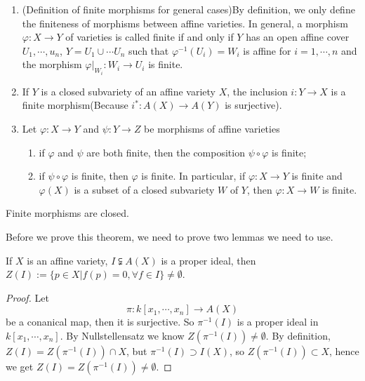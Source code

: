 \begin{remark}{}
  \noindent
	\begin{enumerate}
		\item (Definition of finite morphisms for general cases)By definition, we only define the finiteness of morphisms between affine varieties. In general, a morphism $ \varphi:X\to Y $ of varieties is called finite if and only if $ Y $ has an open affine cover $ U_1,\cdots,u_n $, $ Y=U_1\cup\cdots U_n $ such that $ \varphi^{-1}(U_i)=W_i $ is affine for $i=1,\cdots,n  $ and the morphism $ \varphi|_{W_i}:W_i\to U_i $ is finite.
		\item If $ Y $ is a closed subvariety of an affine variety $ X $, the inclusion $ i:Y\to X $ is a finite morphism(Because $ i^\ast :A(X)\to A(Y) $ is surjective).
		\item Let $ \varphi:X\to Y $ and $ \psi:Y\to Z $ be morphisms of affine varieties
		      \begin{enumerate}
			      \item if $ \varphi $ and $ \psi $ are both finite, then the composition $ \psi\circ\varphi $ is finite;
			      \item if $ \psi\circ \varphi  $ is finite, then $ \varphi $ is finite. In particular, if $ \varphi:X\to Y $ is finite and $ \varphi(X) $ is a subset of a closed subvariety $ W $ of $ Y $, then $ \varphi:X\to W $ is finite.
		      \end{enumerate}
	\end{enumerate}
\end{remark}

\begin{theorem}\label{13-3}
	Finite morphisms are closed.
\end{theorem}
Before we prove this theorem, we need to prove two lemmas we need to use.
\begin{lemma}\label{13-1}
	If $ X $ is an affine variety, $ I\subsetneqq A(X) $ is a proper ideal, then $ Z(I):= \lbrace p\in X|f(p)=0, \forall f\in I \rbrace\neq \emptyset $.
\end{lemma}
\begin{proof}
	Let
	$$
		\pi:k[x_1,\cdots,x_n] \to A(X)
	$$
	be a conanical map, then it is surjective. So $ \pi^{-1}(I) $ is a proper ideal in $ k[x_1,\cdots,x_n] $. By Nullstellensatz we know $ Z(\pi^{-1}(I))\neq \emptyset $. By definition, $ Z(I)=Z(\pi^{-1}(I))\cap X $, but $ \pi^{-1}(I)\supset I(X) $, so $ Z(\pi^{-1}(I))\subset X $, hence we get $ Z(I)=Z(\pi^{-1}(I))\neq \emptyset $.
\end{proof}

